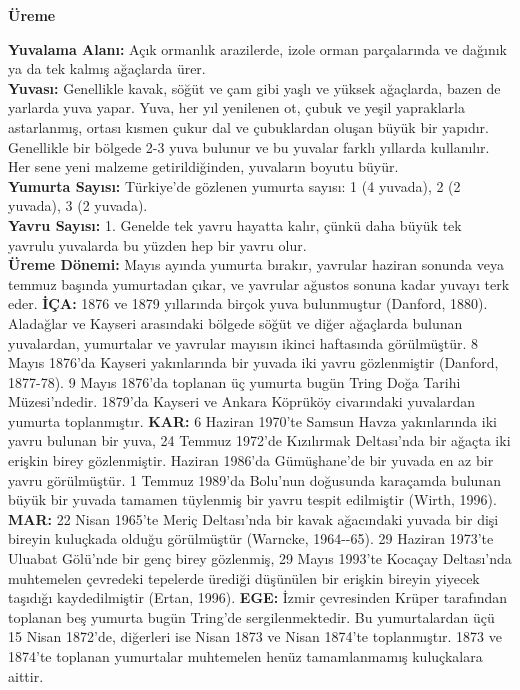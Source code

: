 \documentclass[
  a4paper,
  DIV=11,
  numbers=noendperiod]{scrreprt}
\begin{document}
\textbf{Üreme}

\textbf{Yuvalama Alanı:} Açık ormanlık arazilerde, izole orman
parçalarında ve dağınık ya da tek kalmış ağaçlarda ürer.\\
\textbf{Yuvası:} Genellikle kavak, söğüt ve çam gibi yaşlı ve yüksek
ağaçlarda, bazen de yarlarda yuva yapar. Yuva, her yıl yenilenen ot,
çubuk ve yeşil yapraklarla astarlanmış, ortası kısmen çukur dal ve
çubuklardan oluşan büyük bir yapıdır. Genellikle bir bölgede 2-3 yuva
bulunur ve bu yuvalar farklı yıllarda kullanılır. Her sene yeni malzeme
getirildiğinden, yuvaların boyutu büyür.\\
\textbf{Yumurta Sayısı:} Türkiye'de gözlenen yumurta sayısı: 1 (4
yuvada), 2 (2 yuvada), 3 (2 yuvada).\\
\textbf{Yavru Sayısı:} 1. Genelde tek yavru hayatta kalır, çünkü daha
büyük tek yavrulu yuvalarda bu yüzden hep bir yavru olur.\\
\textbf{Üreme Dönemi:} Mayıs ayında yumurta bırakır, yavrular haziran
sonunda veya temmuz başında yumurtadan çıkar, ve yavrular ağustos sonuna
kadar yuvayı terk eder. \textbf{İÇA:} 1876 ve 1879 yıllarında birçok
yuva bulunmuştur (Danford, 1880). Aladağlar ve Kayseri arasındaki
bölgede söğüt ve diğer ağaçlarda bulunan yuvalardan, yumurtalar ve
yavrular mayısın ikinci haftasında görülmüştür. 8 Mayıs 1876'da Kayseri
yakınlarında bir yuvada iki yavru gözlenmiştir (Danford, 1877-78). 9
Mayıs 1876'da toplanan üç yumurta bugün Tring Doğa Tarihi Müzesi'ndedir.
1879'da Kayseri ve Ankara Köprüköy civarındaki yuvalardan yumurta
toplanmıştır. \textbf{KAR:} 6 Haziran 1970'te Samsun Havza yakınlarında
iki yavru bulunan bir yuva, 24 Temmuz 1972'de Kızılırmak Deltası'nda bir
ağaçta iki erişkin birey gözlenmiştir. Haziran 1986'da Gümüşhane'de bir
yuvada en az bir yavru görülmüştür. 1 Temmuz 1989'da Bolu'nun doğusunda
karaçamda bulunan büyük bir yuvada tamamen tüylenmiş bir yavru tespit
edilmiştir (Wirth, 1996). \textbf{MAR:} 22 Nisan 1965'te Meriç
Deltası'nda bir kavak ağacındaki yuvada bir dişi bireyin kuluçkada
olduğu görülmüştür (Warncke, 1964-\/-65). 29 Haziran 1973'te Uluabat
Gölü'nde bir genç birey gözlenmiş, 29 Mayıs 1993'te Kocaçay Deltası'nda
muhtemelen çevredeki tepelerde ürediği düşünülen bir erişkin bireyin
yiyecek taşıdığı kaydedilmiştir (Ertan, 1996). \textbf{EGE:} İzmir
çevresinden Krüper tarafından toplanan beş yumurta bugün Tring'de
sergilenmektedir. Bu yumurtalardan üçü 15 Nisan 1872'de, diğerleri ise
Nisan 1873 ve Nisan 1874'te toplanmıştır. 1873 ve 1874'te toplanan
yumurtalar muhtemelen henüz tamamlanmamış kuluçkalara aittir.
\end{document}
